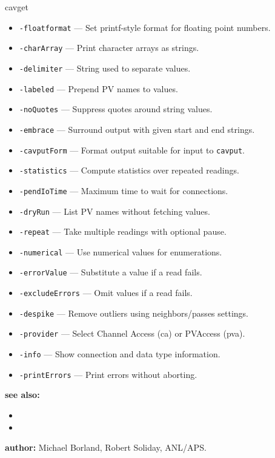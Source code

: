 \begin{sddsprog}{cavget}
\begin{itemize}
    produces names \verb+Q01:I+ through \verb+Q04:I+.
  \item {\tt -floatformat} --- Set printf-style format for floating point numbers.
  \item {\tt -charArray} --- Print character arrays as strings.
  \item {\tt -delimiter} --- String used to separate values.
  \item {\tt -labeled} --- Prepend PV names to values.
  \item {\tt -noQuotes} --- Suppress quotes around string values.
  \item {\tt -embrace} --- Surround output with given start and end strings.
  \item {\tt -cavputForm} --- Format output suitable for input to \verb+cavput+.
  \item {\tt -statistics} --- Compute statistics over repeated readings.
  \item {\tt -pendIoTime} --- Maximum time to wait for connections.
  \item {\tt -dryRun} --- List PV names without fetching values.
  \item {\tt -repeat} --- Take multiple readings with optional pause.
  \item {\tt -numerical} --- Use numerical values for enumerations.
  \item {\tt -errorValue} --- Substitute a value if a read fails.
  \item {\tt -excludeErrors} --- Omit values if a read fails.
  \item {\tt -despike} --- Remove outliers using neighbors/passes settings.
  \item {\tt -provider} --- Select Channel Access (ca) or PVAccess (pva).
  \item {\tt -info} --- Show connection and data type information.
  \item {\tt -printErrors} --- Print errors without aborting.
\end{itemize}
\item \textbf{see also:}
\begin{itemize}
  \item {}
  \item {}
\end{itemize}
\item \textbf{author:} Michael Borland, Robert Soliday, ANL/APS.
\end{sddsprog}
